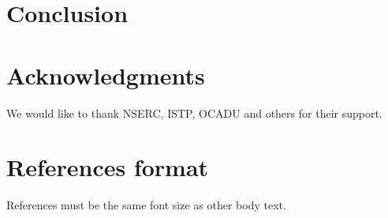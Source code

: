 \documentclass{SIGCHI2015LaTex/sigchi}
\begin{document}
\section{Conclusion}



\section{Acknowledgments}

We would like to thank NSERC, ISTP, OCADU and others for their support.

%
%
%
%
%
\balance

\section{References format}
References must be the same font size as other body text.



\end{document}
